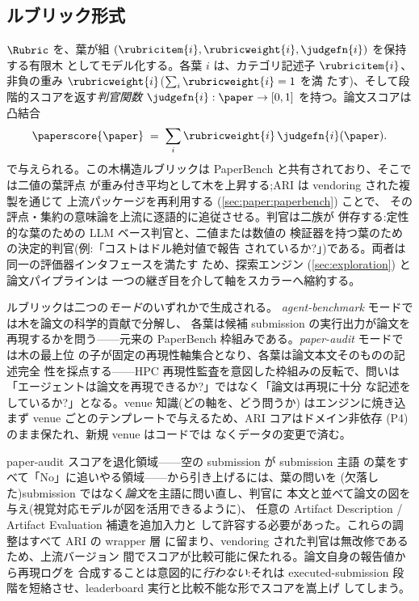 \subsection{ルブリック形式}\label{sec:paper:rubric}

 $\Rubric$ を、葉が組
$(\rubricitem{i},\rubricweight{i},\judgefn{i})$ を保持する有限木
としてモデル化する。各葉 $i$ は、カテゴリ記述子 $\rubricitem{i}$、
非負の重み $\rubricweight{i}$($\sum_i \rubricweight{i}=1$ を満
たす)、そして段階的スコアを返す\emph{判官関数}
$\judgefn{i}:\paper\to[0,1]$ を持つ。論文スコアは凸結合
\begin{equation}\label{eq:paperscore}
  \paperscore{\paper} \;=\; \sum_i \rubricweight{i}\,\judgefn{i}(\paper).
\end{equation}
で与えられる。この木構造ルブリックは PaperBench
\cite{starace2025paperbench} と共有されており、そこでは二値の葉評点
が重み付き平均として木を上昇する;ARI は vendoring された複製を通じて
上流パッケージを再利用する (\cref{sec:paper:paperbench}) ことで、
その評点・集約の意味論を上流に逐語的に追従させる。判官は二族が
併存する:定性的な葉のための LLM ベース判官と、二値または数値の
検証器を持つ葉のための決定的判官(例:「コストはドル絶対値で報告
されているか?」)である。両者は同一の評価器インタフェースを満たす
ため、探索エンジン (\cref{sec:exploration}) と論文パイプラインは
一つの継ぎ目を介して軸をスカラーへ縮約する。

ルブリックは二つの\emph{モード}のいずれかで生成される。
\emph{agent-benchmark} モードでは木を論文の科学的貢献で分解し、
各葉は候補 submission の実行出力が論文を再現するかを問う——元来の
PaperBench 枠組みである。\emph{paper-audit} モードでは木の最上位
の子が固定の再現性軸集合となり、各葉は論文本文そのものの記述完全
性を採点する——HPC 再現性監査を意図した枠組みの反転で、問いは
「エージェントは論文を再現できるか?」ではなく「論文は再現に十分
な記述をしているか?」となる。venue 知識(どの軸を、どう問うか)
はエンジンに焼き込まず venue ごとのテンプレートで与えるため、ARI
コアはドメイン非依存 (P4) のまま保たれ、新規 venue はコードでは
なくデータの変更で済む。

paper-audit スコアを退化領域——空の submission が submission 主語
の葉をすべて「No」に追いやる領域——から引き上げるには、葉の問いを
(欠落した)submission ではなく\emph{論文}を主語に問い直し、判官に
本文と並べて論文の図を与え(視覚対応モデルが図を活用できるように)、
任意の Artifact Description / Artifact Evaluation 補遺を追加入力と
して許容する必要があった。これらの調整はすべて ARI の wrapper 層
に留まり、vendoring された判官は無改修であるため、上流バージョン
間でスコアが比較可能に保たれる。論文自身の報告値から再現ログを
合成することは意図的に\emph{行わない}:それは executed-submission
段階を短絡させ、leaderboard 実行と比較不能な形でスコアを嵩上げ
してしまう。

